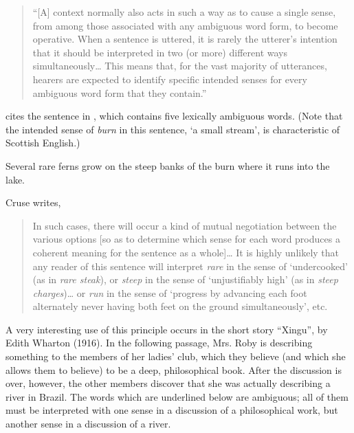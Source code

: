\begin{quote}
“[A] context normally also acts in such a way as to cause a single sense, from among those associated with any ambiguous word form, to become operative. When a sentence is uttered, it is rarely the utterer’s intention that it should be interpreted in two (or more) different ways simultaneously… This means that, for the vast majority of utterances, hearers are expected to identify specific intended senses for every ambiguous word form that they contain.”
\end{quote}


\citet[54]{Cruse1986} cites the sentence in , which contains five lexically ambiguous words. (Note that the intended sense of \textit{burn} in this sentence, ‘a small stream’, is characteristic of Scottish English.)


\ea \label{ex:5.16}
Several rare ferns grow on the steep banks of the burn where it runs into the lake.
\z

Cruse writes,

\begin{quote}
In such cases, there will occur a kind of mutual negotiation between the various options [so as to determine which sense for each word produces a coherent meaning for the sentence as a whole]… It is highly unlikely that any reader of this sentence will interpret \textit{rare} in the sense of ‘undercooked’ (as in \textit{rare steak}), or \textit{steep} in the sense of ‘unjustifiably high’ (as in \textit{steep charges})… or \textit{run} in the sense of ‘progress by advancing each foot alternately never having both feet on the ground simultaneously’, etc.
\end{quote}


A very interesting use of this principle occurs in the short story “Xingu”, by Edith Wharton (1916). In the following passage, Mrs. Roby is describing something to the members of her ladies’ club, which they believe (and which she allows them to believe) to be a deep, philosophical book. After the discussion is over, however, the other members discover that she was actually describing a river in Brazil. The words which are underlined below are ambiguous; all of them must be interpreted with one sense in a discussion of a philosophical work, but another sense in a discussion of a river.

